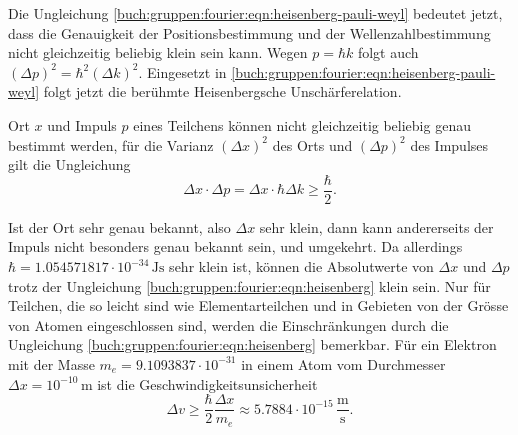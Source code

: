 Die Ungleichung
\eqref{buch:gruppen:fourier:eqn:heisenberg-pauli-weyl}
bedeutet jetzt, dass die Genauigkeit der Positionsbestimmung und der
Wellenzahlbestimmung nicht gleichzeitig beliebig klein sein kann.
Wegen $p=\hbar k$ folgt auch $(\Delta p)^2 = \hbar^2 (\Delta k)^2$.
Eingesetzt in 
\eqref{buch:gruppen:fourier:eqn:heisenberg-pauli-weyl}
folgt jetzt die berühmte Heisenbergsche Unschärferelation.

\begin{satz}[Heisenberg]
\label{buch:gruppen:fourier:satz:heisenberg}
%
%
%
Ort $x$ und Impuls $p$ eines Teilchens können nicht gleichzeitig beliebig
genau bestimmt werden, für die Varianz $(\Delta x)^2$ des Orts und
$(\Delta p)^2$ des Impulses gilt die Ungleichung
\begin{equation}
\Delta x\cdot \Delta p
=
\Delta x \cdot \hbar \Delta k
\ge 
\frac{\hbar}2.
\label{buch:gruppen:fourier:eqn:heisenberg}
\end{equation}
\end{satz}
Ist der Ort sehr genau bekannt, also $\Delta x$ sehr klein, dann kann 
andererseits der Impuls nicht besonders genau bekannt sein, und umgekehrt.
Da allerdings $\hbar=1.054571817\cdot 10^{-34}\,\text{Js}$ sehr klein 
ist, können die Absolutwerte von $\Delta x$ und $\Delta p$ trotz der 
Ungleichung \eqref{buch:gruppen:fourier:eqn:heisenberg} klein sein.
Nur für Teilchen, die so leicht sind wie Elementarteilchen und 
in Gebieten von der Grösse von Atomen eingeschlossen sind, werden
die Einschränkungen durch die Ungleichung
\eqref{buch:gruppen:fourier:eqn:heisenberg} bemerkbar.
Für ein Elektron mit der Masse $m_e=9.1093837\cdot 10^{-31}$ in einem Atom 
vom Durchmesser $\Delta x=10^{-10}\,\text{m}$ ist die
Geschwindigkeitsunsicherheit
\[
\Delta v 
\ge 
\frac{\hbar}{2} \frac{\Delta x}{m_e}
\approx
5.7884\cdot 10^{-15}\,\frac{\text{m}}{\text{s}}.
\]




